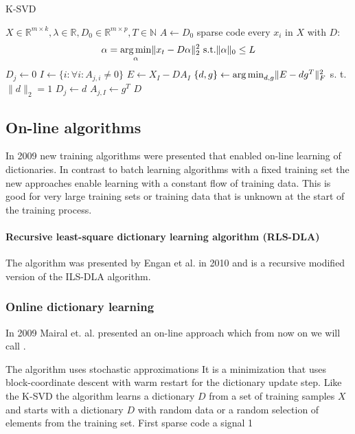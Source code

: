 \begin{algorithm}[H]
\caption{K-SVD}
\label{alg:k-svd}
\begin{algorithmic}[1]
\REQUIRE $X \in \mathbb{R}^{m \times k}, \lambda \in
\mathbb{R}, D_0 \in \mathbb{R}^{m \times p}, T \in \mathbb{N}$
\STATE $A \gets D_0$
\STATE sparse code every $x_i$ in $X$ with $D$:
\begin{equation}
\alpha = \operatorname*{arg\,min}_{\alpha}\lVert
x_t - D\alpha\rVert_2^2 \text{ s.t.} \lVert\alpha\rVert_0 \leq L
\end{equation}
\label{alg:k-svd_start}
\STATE $D_j \gets 0$
\STATE $I \gets \{ i : \forall i : A_{j,i} \neq 0 \}$
\STATE $E \gets X_I - DA_I$
\STATE $\{ d,g\} \gets \operatorname*{arg\,min}_{d,g} \lVert E- dg^T \rVert_F^{2}$ s. t. $\lVert
d
\rVert_{2} = 1$
\STATE $D_j \gets d$
\STATE $A_{j,I} \gets g^T$
\ENDFOR\label{alg:k-svd_end}
\ENDFOR
\RETURN $D$
\end{algorithmic}
\end{algorithm}

\subsection{On-line algorithms}
In 2009 new training algorithms were presented that enabled on-line learning of
dictionaries. In contrast to batch learning algorithms with a fixed training set
the new approaches enable learning with a constant flow of training data. This
is good for very large training sets or training data that is unknown at the
start of the training process.

\paragraph{Recursive least-square dictionary learning algorithm (RLS-DLA)}
The algorithm was presented by Engan et al. in 2010\cite{Engan2010} and is a
recursive modified version of the ILS-DLA algorithm.


\subsubsection{Online dictionary learning}
\label{sec:mairal}
In 2009 Mairal et. al.\cite{Mairal2009} presented an on-line approach which from
now on we will call \trainDL.

The algorithm uses stochastic approximations 
It is a minimization that uses block-coordinate descent with warm restart for
the dictionary update step.
Like the K-SVD the algorithm learns a dictionary $D$ from a set of training
samples $X$ and starts with a dictionary $D$ with random data or a random
selection of elements from the training set. 
First sparse code a signal  1

